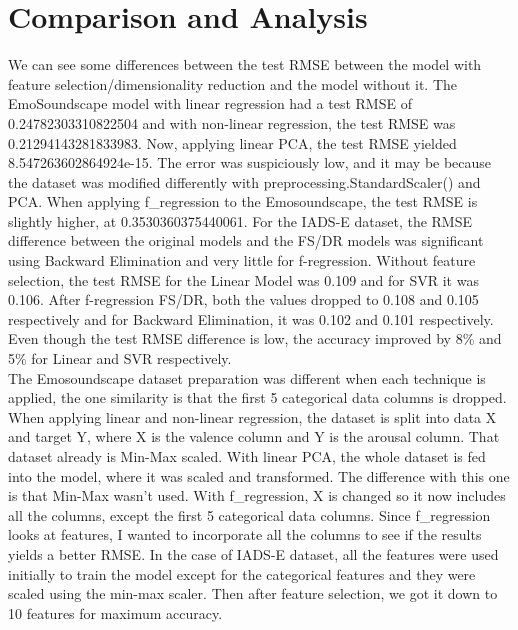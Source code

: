 \documentclass[conference]{IEEEtran}
\begin{document}
\section{Comparison and Analysis}
\label{sec:models}
\noindent
We can see some differences between the test RMSE between the model with feature selection/dimensionality reduction and the model without it. The EmoSoundscape model with linear regression had a test RMSE of 0.24782303310822504 and with non-linear regression, the test RMSE was 0.21294143281833983. Now, applying linear PCA, the test RMSE yielded 8.547263602864924e-15. The error was suspiciously low, and it may be because the dataset was modified differently with preprocessing.StandardScaler() and PCA. When applying f\_regression to the Emosoundscape, the test RMSE is slightly higher, at 0.3530360375440061. For the IADS-E dataset, the RMSE difference between the original models and the FS/DR models was significant using Backward Elimination and very little for f-regression. Without feature selection, the test RMSE for the Linear Model was 0.109 and for SVR it was 0.106. After f-regression FS/DR, both the values dropped to 0.108 and 0.105 respectively and for Backward Elimination, it was 0.102 and 0.101 respectively. Even though the test RMSE difference is low, the accuracy improved by 8\% and 5\% for Linear and SVR respectively.\\

\noindent
The Emosoundscape dataset preparation was different when each technique is applied, the one similarity is that the first 5 categorical data columns is dropped. When applying linear and non-linear regression, the dataset is split into data X and target Y, where X is the valence column and Y is the arousal column. That dataset already is Min-Max scaled. With linear PCA, the whole dataset is fed into the model, where it was scaled and transformed. The difference with this one is that Min-Max wasn't used. With f\_regression, X is changed so it now includes all the columns, except the first 5 categorical data columns. Since f\_regression looks at features, I wanted to incorporate all the columns to see if the results yields a better RMSE. In the case of IADS-E dataset, all the features were used initially to train the model except for the categorical features and they were scaled using the min-max scaler. Then after feature selection, we got it down to 10 features for maximum accuracy.

\end{document}
